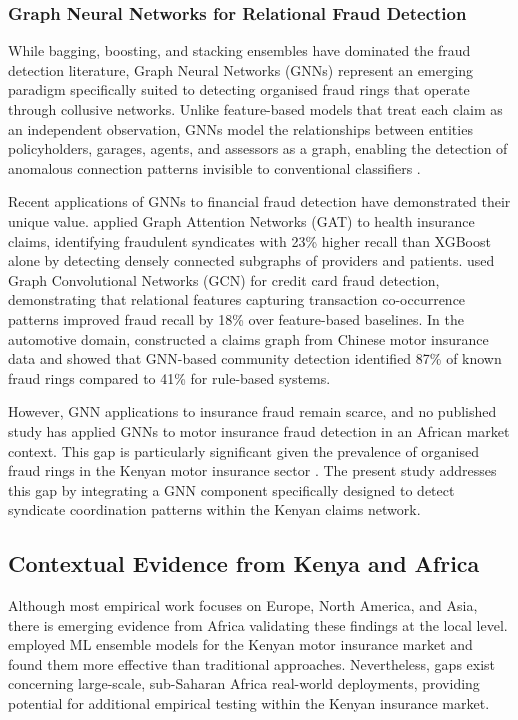 \documentclass[12pt,a4paper,oneside]{report}
\numberwithin{equation}{chapter}
\begin{document}
\subsubsection{Graph Neural Networks for Relational Fraud Detection}

While bagging, boosting, and stacking ensembles have dominated the fraud detection literature,
Graph Neural Networks (GNNs) represent an emerging paradigm specifically suited to detecting
organised fraud rings that operate through collusive networks. Unlike feature-based models that
treat each claim as an independent observation, GNNs model the relationships between
entities policyholders, garages, agents, and assessors as a graph, \cite{liu2022graph} enabling the detection of
anomalous connection patterns invisible to conventional classifiers .

Recent applications of GNNs to financial fraud detection have demonstrated their unique value.
\cite{wang2021graph} applied Graph Attention Networks (GAT) to health insurance claims,
identifying fraudulent syndicates with 23\% higher recall than XGBoost alone by detecting densely
connected subgraphs of providers and patients. \cite{dou2020robust} used Graph Convolutional
Networks (GCN) for credit card fraud detection, demonstrating that relational features capturing
transaction co-occurrence patterns improved fraud recall by 18\% over feature-based baselines.
In the automotive domain, \cite{li2023graph} constructed a claims graph from Chinese motor
insurance data and showed that GNN-based community detection identified 87\% of known fraud rings
compared to 41\% for rule-based systems.

However, GNN applications to insurance fraud remain scarce, and no published study has applied
GNNs to motor insurance fraud detection in an African market context. This gap is particularly
significant given the prevalence of organised fraud rings in the Kenyan motor insurance sector
\cite{njeru2022detection}. The present study addresses this gap by integrating a GNN component
specifically designed to detect syndicate coordination patterns within the Kenyan claims network.

\subsection{Contextual Evidence from Kenya and Africa}

Although most empirical work focuses on Europe, North America, and Asia, there is emerging
evidence from Africa validating these findings at the local level. \cite{njeru2022detection}
employed ML ensemble models for the Kenyan motor insurance market and found them more effective
than traditional approaches. Nevertheless, gaps exist concerning large-scale, sub-Saharan Africa
real-world deployments, providing potential for additional empirical testing within the Kenyan
insurance market.
\end{document}
